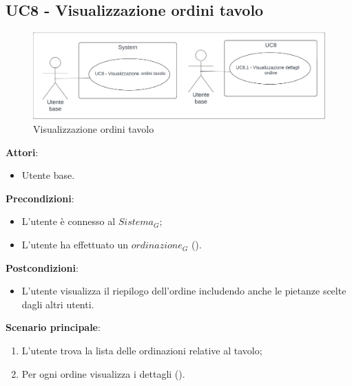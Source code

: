 \subsection{UC8 - Visualizzazione ordini tavolo}\label{usecase:8}
\begin{figure}[H]
    \centering
    \includegraphics[width=0.9\linewidth]{ucd/ucd8.png}
    \caption{Visualizzazione ordini tavolo}
\end{figure}
\textbf{Attori}:
\begin{itemize}
    \item Utente base.
\end{itemize}
\textbf{Precondizioni}:
\begin{itemize}
    \item L'utente è connesso al $\textit{Sistema}_G$;
    \item L'utente ha effettuato un $\textit{ordinazione}_G$ ().
\end{itemize}
\textbf{Postcondizioni}:
\begin{itemize}
    \item L'utente visualizza il riepilogo dell'ordine includendo anche le pietanze scelte dagli altri utenti.
\end{itemize}
\textbf{Scenario principale}:
\begin{enumerate}
    \item L'utente trova la lista delle ordinazioni relative al tavolo;
    \item Per ogni ordine visualizza i dettagli ().
\end{enumerate}
